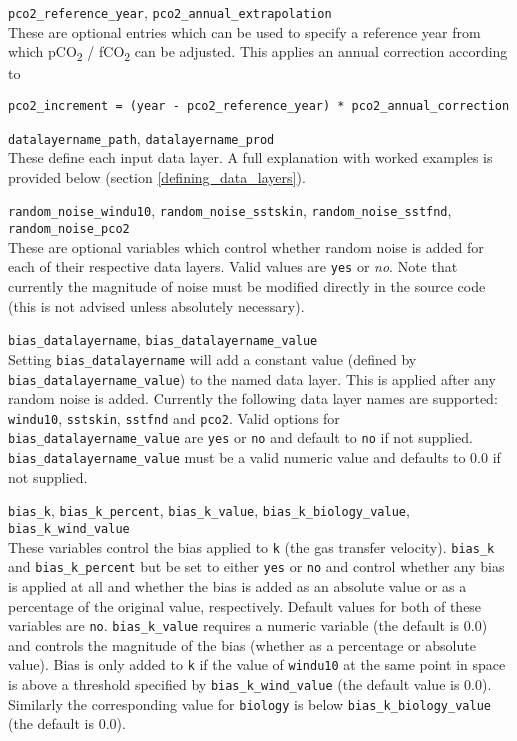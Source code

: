 \documentclass[]{scrartcl}
\newcommand{\conflistingsep}{\vspace{0.40cm}}
\begin{document}
\conflistingsep \noindent \texttt{pco2\_reference\_year}, \texttt{pco2\_annual\_extrapolation} \\
These are optional entries which can be used to specify a reference year from which pCO\textsubscript{2} / fCO\textsubscript{2} can be adjusted. This applies an annual correction according to
\begin{lstlisting}
pco2_increment = (year - pco2_reference_year) * pco2_annual_correction
\end{lstlisting}

\conflistingsep \noindent \texttt{datalayername\_path}, \texttt{datalayername\_prod} \\
These define each input data layer. A full explanation with worked examples is provided below (section \ref{defining_data_layers}).

\conflistingsep \noindent \texttt{random\_noise\_windu10}, \texttt{random\_noise\_sstskin}, \texttt{random\_noise\_sstfnd}, \texttt{random\_noise\_pco2} \\
These are optional variables which control whether random noise is added for each of their respective data layers. Valid values are \texttt{yes} or \textit{no}. Note that currently the magnitude of noise must be modified directly in the source code (this is not advised unless absolutely necessary).

\conflistingsep \noindent \texttt{bias\_datalayername}, \texttt{bias\_datalayername\_value}\\
Setting \texttt{bias\_datalayername} will add a constant value (defined by \texttt{bias\_datalayername\_value}) to the named data layer. This is applied after any random noise is added. Currently the following data layer names are supported: \texttt{windu10}, \texttt{sstskin}, \texttt{sstfnd} and \texttt{pco2}. Valid options for \texttt{bias\_datalayername\_value} are \texttt{yes} or \texttt{no} and default to \texttt{no} if not supplied. \texttt{bias\_datalayername\_value} must be a valid numeric value and defaults to $0.0$ if not supplied.

\conflistingsep \noindent \texttt{bias\_k}, \texttt{bias\_k\_percent}, \texttt{bias\_k\_value}, \texttt{bias\_k\_biology\_value}, \texttt{bias\_k\_wind\_value}\\
These variables control the bias applied to \texttt{k} (the gas transfer velocity). \texttt{bias\_k} and \texttt{bias\_k\_percent} but be set to either \texttt{yes} or \texttt{no} and control whether any bias is applied at all and whether the bias is added as an absolute value or as a percentage of the original value, respectively. Default values for both of these variables are \texttt{no}. \texttt{bias\_k\_value} requires a numeric variable (the default is $0.0$) and controls the magnitude of the bias (whether as a percentage or absolute value). Bias is only added to \texttt{k} if the value of \texttt{windu10} at the same point in space is above a threshold specified by \texttt{bias\_k\_wind\_value} (the default value is $0.0$). Similarly the corresponding value for \texttt{biology} is below \texttt{bias\_k\_biology\_value} (the default is $0.0$).
\end{document}
